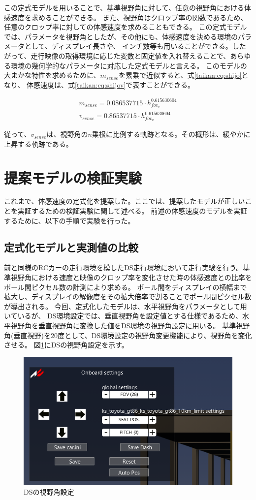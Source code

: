 この定式モデルを用いることで、基準視野角に対して、任意の視野角における体感速度を求めることができる。
また、視野角はクロップ率の関数であるため、任意のクロップ率に対しての体感速度を求めることもできる。
この定式モデルでは、パラメータを視野角としたが、その他にも、体感速度を決める環境のパラメータとして、ディスプレイ長さや、
インチ数等も用いることができる。したがって、走行映像の取得環境に応じた変数と固定値を入れ替えることで、あらゆる環境の幾何学的なパラメータに対応した定式モデルと言える。
このモデルの大まかな特性を求めるために、$m_{sense}$を累乗で近似すると、式\eqref{taikan:eq:shijo}となり、
体感速度は、式\eqref{taikan:eq:shijov}で表すことができる。

\begin{align}
  m_{sense} = 0.086537715\cdot h_{fov_v}^{0.615630604} \label{taikan:eq:shijo}\\
  v_{sense} = 0.86537715\cdot h_{fov_v}^{0.615630604} \label{taikan:eq:shijov}
\end{align}

従って、$v_{sense}$は、視野角の$n$乗根に比例する軌跡となる。その概形は、緩やかに上昇する軌跡である。

\section{提案モデルの検証実験}
これまで、体感速度の定式化を提案した。ここでは、提案したモデルが正しいことを実証するための検証実験に関して述べる。
前述の体感速度のモデルを実証するために、以下の手順で実験を行った。

\subsection{定式化モデルと実測値の比較}
前と同様のRCカーの走行環境を模したDS走行環境において走行実験を行う。基準視野角における速度と映像のクロップ率を変化させた時の体感速度との比率をポール間ピクセル数の計測により求める。
ポール間をディスプレイの横幅まで拡大し、ディスプレイの解像度をその拡大倍率で割ることでポール間ピクセル数が導出される。
今回、定式化したモデルは、水平視野角をパラメータとして用いているが、
DS環境設定では、垂直視野角を設定値とする仕様であるため、水平視野角を垂直視野角に変換した値をDS環境の視野角設定に用いる。
基準視野角(垂直視野)を20度として、DS環境設定の視野角変更機能により、視野角を変化させる。
図\ref{taikan:shiyaset}にDSの視野角設定を示す。

\begin{figure}[h]
  \begin{center}
  \includegraphics[width=.65\linewidth]{img/17.png}
  \caption{DSの視野角設定}
  \label{taikan:shiyaset}
  \end{center}
\end{figure}

